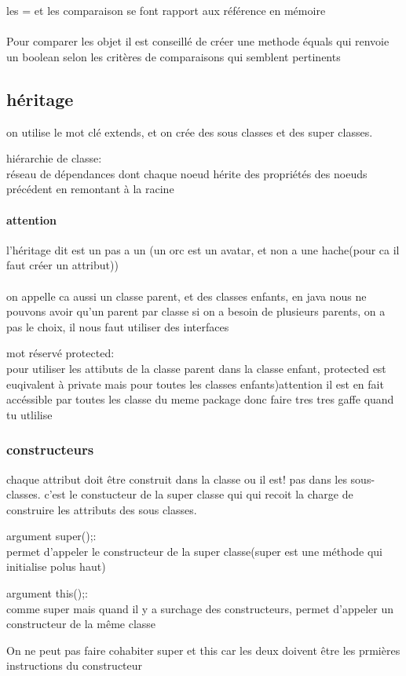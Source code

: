 \documentclass[a4paper,10pt]{article}
\begin{document}
 les = et les comparaison se font rapport aux référence en mémoire
\paragraph{}
Pour comparer les objet il est conseillé de créer une methode équals qui renvoie un boolean selon les critères de comparaisons qui semblent pertinents
\subsection{héritage}
on utilise le mot clé extends, et on crée des sous classes et des super classes.
\begin{description}
 \item hiérarchie de classe:\\{réseau de dépendances dont chaque noeud hérite des propriétés des noeuds précédent en remontant à la racine}
\end{description}
\paragraph{attention}
l'héritage dit est un pas a un (un orc est un avatar, et non a une hache(pour ca il faut créer un attribut))
\paragraph{}
on appelle ca aussi un classe parent, et des classes enfants, en java nous ne pouvons avoir qu'un parent par classe
\newline
si on a besoin de plusieurs parents, on a pas le choix, il nous faut utiliser des interfaces
\begin{description}
 \item mot réservé protected:\\{pour utiliser les attibuts de la classe parent dans la classe enfant, protected est euqivalent à private mais pour toutes les classes enfants)attention il est en fait accéssible par toutes les classe du meme package donc faire tres tres gaffe quand tu utlilise}
\end{description}
\subsubsection{constructeurs}
chaque attribut doit être construit dans la classe ou il est! pas dans les sous-classes. c'est le constucteur de la super classe qui
 qui recoit la charge de construire les attributs des sous classes.
 \begin{description} 
  \item argument super();:\\{permet d'appeler le constructeur de la super classe(super est une méthode qui initialise polus haut)}
  \item argument this();:\\{comme super mais quand il y a surchage des constructeurs, permet d'appeler un constructeur de la même classe}
 \end{description}
On ne peut pas faire cohabiter super et this car les deux doivent être les prmières instructions du constructeur
\end{document}
